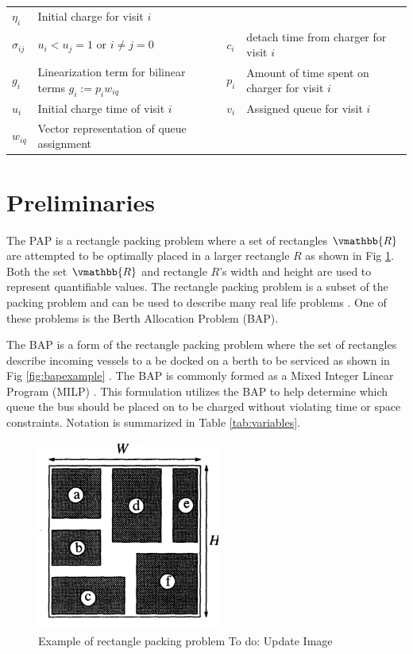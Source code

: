 \documentclass[letterpaper, 10pt, conference]{IEEEtran}
\newcommand{\TODO}[1]{{\color{green} To do: #1}} %
\begin{document}
\begin{table}[!t]
\begin{tabular}{l l l l}
			$\eta_i$      & Initial charge for visit $i$                  \\
			$\sigma_{ij}$ & $u_i < u_j = 1$ \textrm{ or } $i \neq j = 0$  &
			$c_i$         & detach time from charger for visit $i$                    \\
			$g_i$         & Linearization term for bilinear terms $g_i := p_i w_{iq}$  &
			$p_i$         & Amount of time spent on charger for visit $i$ \\
			$u_i$         & Initial charge time of visit $i$                          &
			$v_i$         & Assigned queue for visit $i$                  \\
			$w_{iq}$      & Vector representation of queue assignment                 \\
			\bottomrule
	\end{tabular}
\end{table}

\section{Preliminaries}
\label{sec:preliminaries}
The PAP is a rectangle packing problem where a set of rectangles \(\vmathbb{R}\) are attempted to be optimally placed in a larger rectangle \(R\) as shown in Fig \ref{fig:packexample}. Both the set \(\vmathbb{R}\) and rectangle \(R\)'s width and height are used to represent quantifiable values. The rectangle packing problem is a subset of the packing problem and can be used to describe many real life problems \cite{Bruin2013}. One of these problems is the Berth Allocation Problem (BAP).

The BAP is a form of the rectangle packing problem where the set of rectangles describe incoming vessels to a be docked on a berth to be serviced as shown in Fig \ref{fig:bapexample} \cite{Dai2008}. The BAP is commonly formed as a Mixed Integer Linear Program (MILP) \cite{Frojan2015,Buhrkal2010}. This formulation utilizes the BAP to help determine which queue the bus should be placed on to be charged without violating time or space constraints. Notation is summarized in Table \ref{tab:variables}.

\begin{figure}
	\centerline{\includegraphics[width=6cm]{chip-pack.png}}
	\caption{Example of rectangle packing problem \TODO{Update Image}}
	\label{fig:packexample}
\end{figure}
\end{document}
